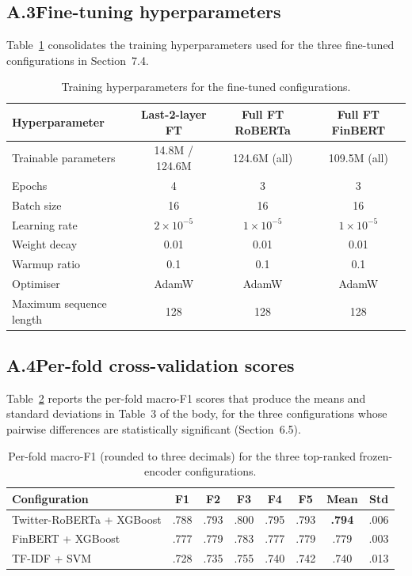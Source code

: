 \documentclass[12pt,a4paper]{article}
\begin{document}
\subsection*{A.3\quad Fine-tuning hyperparameters}
Table~\ref{tab:hyperparams_app} consolidates the training hyperparameters used for the three fine-tuned configurations in Section~7.4.

\begin{table}[!htbp]
\centering
\small
\setlength{\tabcolsep}{4pt}
\begin{tabular}{lccc}
\toprule
\textbf{Hyperparameter} & \textbf{Last-2-layer FT} & \textbf{Full FT RoBERTa} & \textbf{Full FT FinBERT} \\
\midrule
Trainable parameters       & 14.8M / 124.6M    & 124.6M (all)      & 109.5M (all) \\
Epochs                     & 4                 & 3                 & 3 \\
Batch size                 & 16                & 16                & 16 \\
Learning rate              & $2\!\times\!10^{-5}$ & $1\!\times\!10^{-5}$ & $1\!\times\!10^{-5}$ \\
Weight decay               & 0.01              & 0.01              & 0.01 \\
Warmup ratio               & 0.1               & 0.1               & 0.1 \\
Optimiser                  & AdamW             & AdamW             & AdamW \\
Maximum sequence length    & 128               & 128               & 128 \\
\bottomrule
\end{tabular}
\caption{Training hyperparameters for the fine-tuned configurations.}
\label{tab:hyperparams_app}
\end{table}

\subsection*{A.4\quad Per-fold cross-validation scores}
Table~\ref{tab:cv_app} reports the per-fold macro-F1 scores that produce the means and standard deviations in Table~3 of the body, for the three configurations whose pairwise differences are statistically significant (Section~6.5).

\begin{table}[!htbp]
\centering
\small
\begin{tabular}{lccccccc}
\toprule
\textbf{Configuration} & \textbf{F1} & \textbf{F2} & \textbf{F3} & \textbf{F4} & \textbf{F5} & \textbf{Mean} & \textbf{Std} \\
\midrule
Twitter-RoBERTa + XGBoost  & .788 & .793 & .800 & .795 & .793 & \textbf{.794} & .006 \\
FinBERT + XGBoost          & .777 & .779 & .783 & .777 & .779 & .779          & .003 \\
TF-IDF + SVM               & .728 & .735 & .755 & .740 & .742 & .740          & .013 \\
\bottomrule
\end{tabular}
\caption{Per-fold macro-F1 (rounded to three decimals) for the three top-ranked frozen-encoder configurations.}
\label{tab:cv_app}
\end{table}
\end{document}
